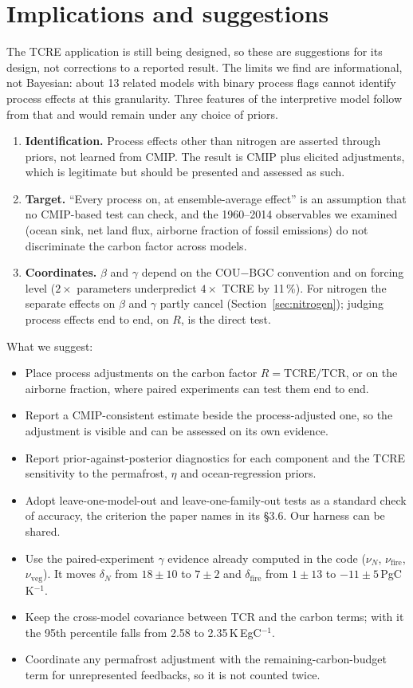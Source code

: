 \documentclass[11pt,a4paper]{article}
\newcommand{\Kpe}{K\,EgC$^{-1}$}
\newcommand{\Pgk}{PgC\,K$^{-1}$}
\begin{document}
\section*{Implications and suggestions}

The TCRE application is still being designed, so these are suggestions for its design, not corrections to a reported result. The limits we find are informational, not Bayesian: about 13 related models with binary process flags cannot identify process effects at this granularity. Three features of the interpretive model follow from that and would remain under any choice of priors.

\begin{enumerate}
\item \textbf{Identification.} Process effects other than nitrogen are asserted through priors, not learned from CMIP. The result is CMIP plus elicited adjustments, which is legitimate but should be presented and assessed as such.
\item \textbf{Target.} ``Every process on, at ensemble-average effect'' is an assumption that no CMIP-based test can check, and the 1960--2014 observables we examined (ocean sink, net land flux, airborne fraction of fossil emissions) do not discriminate the carbon factor across models.
\item \textbf{Coordinates.} $\beta$ and $\gamma$ depend on the COU$-$BGC convention and on forcing level ($2\times$ parameters underpredict $4\times$ TCRE by 11\,\%). For nitrogen the separate effects on $\beta$ and $\gamma$ partly cancel (Section~\ref{sec:nitrogen}); judging process effects end to end, on $R$, is the direct test.
\end{enumerate}

What we suggest:
\begin{itemize}
\item Place process adjustments on the carbon factor $R = \mathrm{TCRE}/\mathrm{TCR}$, or on the airborne fraction, where paired experiments can test them end to end.
\item Report a CMIP-consistent estimate beside the process-adjusted one, so the adjustment is visible and can be assessed on its own evidence.
\item Report prior-against-posterior diagnostics for each component and the TCRE sensitivity to the permafrost, $\eta$ and ocean-regression priors.
\item Adopt leave-one-model-out and leave-one-family-out tests as a standard check of accuracy, the criterion the paper names in its \S3.6. Our harness can be shared.
\item Use the paired-experiment $\gamma$ evidence already computed in the code ($\nu_N$, $\nu_\mathrm{fire}$, $\nu_\mathrm{veg}$). It moves $\delta_N$ from $18 \pm 10$ to $7 \pm 2$ and $\delta_\mathrm{fire}$ from $1 \pm 13$ to $-11 \pm 5$\,\Pgk.
\item Keep the cross-model covariance between TCR and the carbon terms; with it the 95th percentile falls from 2.58 to 2.35\,\Kpe.
\item Coordinate any permafrost adjustment with the remaining-carbon-budget term for unrepresented feedbacks, so it is not counted twice.
\end{itemize}
\end{document}
